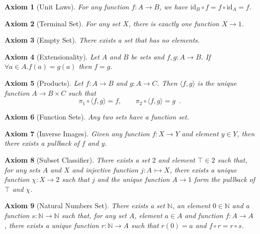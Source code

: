 \documentclass{book}
\newtheorem{ax}{Axiom}[chapter]
\theoremstyle{definition}
\newcommand{\id}[1]{\ensuremath{\mathrm{id}_{#1}}}
\begin{document}
\begin{ax}[Unit Laws]
For any function $f : A \rightarrow B$, we have $\id{B} \circ f = f \circ \id{A} = f$.
\end{ax}

\begin{ax}[Terminal Set]
For any set $X$, there is exactly one function $X \rightarrow 1$.
\end{ax}

\begin{ax}[Empty Set]
There exists a set that has no elements.
\end{ax}

\begin{ax}[Extensionality]
Let $A$ and $B$ be sets and $f,g : A \rightarrow B$.
If $\forall a \in A. f(a) = g(a)$ then $f = g$. \end{ax}

\begin{ax}[Products]
Let $f : A \rightarrow B$ and $g : A \rightarrow C$. Then $\langle f,g \rangle$ is the unique function $A \rightarrow B \times C$ such that
\[ \pi_1 \circ \langle f,g \rangle = f, \qquad \pi_2 \circ \langle f,g \rangle = g \enspace . \]
\end{ax}

\begin{ax}[Function Sets]
Any two sets have a function set.
\end{ax}

\begin{ax}[Inverse Images]
Given any function $f : X \rightarrow Y$ and element $y \in Y$, then there exists a pullback of $f$ and $y$.
\end{ax}

\begin{ax}[Subset Classifier]
There exists a set $2$ and element $\top \in 2$ such that, for any sets $A$ and $X$ and injective function $j : A \rightarrowtail X$, there exists a unique function $\chi : X \rightarrow 2$ such that $j$ and the unique function $A \rightarrow 1$ form the pullback of $\top$ and $\chi$.
\end{ax}

\begin{ax}[Natural Numbers Set]
There exists a set $\mathbb{N}$, an element $0 \in \mathbb{N}$ and a function $s : \mathbb{N} \rightarrow \mathbb{N}$ such that, for any set $A$, element $a \in A$ and function $f : A \rightarrow A$, there exists a unique function $r : \mathbb{N} \rightarrow A$ such that $r(0) = a$ and $f \circ r = r \circ s$.
\end{ax}
\end{document}
